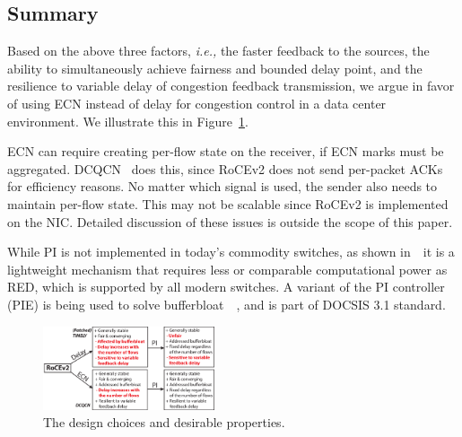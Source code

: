 \subsection{Summary}
Based on the above three factors, {\em i.e.,} the faster feedback to the sources, 
the ability to simultaneously achieve fairness and bounded delay point, and the resilience 
to variable delay of congestion feedback transmission, we argue
in favor of using ECN instead of delay for congestion control in a data center
environment. We illustrate this in Figure~\ref{fig:design_choice}.

ECN can require creating per-flow state on the receiver, if ECN marks must be
aggregated. DCQCN~\cite{dcqcn} does this, since RoCEv2 does not send per-packet
ACKs for efficiency reasons. No matter which signal is used, the sender also needs
to maintain per-flow state. This may not be scalable since
RoCEv2 is implemented on the NIC.  
Detailed discussion of these issues is outside the scope of this paper.

While PI is not implemented in today's commodity switches, as shown
in~\cite{hollot2001designing}~it is a lightweight mechanism that requires less
or comparable computational power as RED, which is supported by all modern
switches. A variant of the PI controller (PIE) is being used to solve
bufferbloat~\cite{conf/hpsr/PanNPPSBV13,bufferbloat-pi}~, and is part of DOCSIS 3.1
standard.

\begin{figure}[t]
 \center
\includegraphics[width=0.45\textwidth]{figures/design_choice.eps}
\vspace{-0.5em}
 \caption{The design choices and desirable properties.}
\vspace{-1.5em}
\label{fig:design_choice}
\end{figure}


